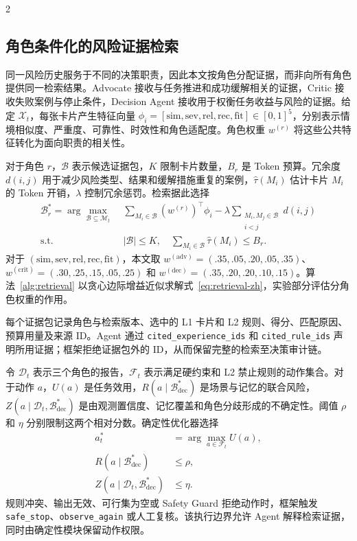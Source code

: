 \documentclass[10pt]{article}
\newcommand{\code}[1]{\texttt{#1}}
\begin{document}
\begin{multicols}{2}
\subsection{角色条件化的风险证据检索}

同一风险历史服务于不同的决策职责，因此本文按角色分配证据，而非向所有角色提供同一检索结果。Advocate 接收与任务推进和成功缓解相关的证据，Critic 接收失败案例与停止条件，Decision Agent 接收用于权衡任务收益与风险的证据。给定 $\mathcal{X}_t$，每张卡片产生特征向量 $\phi_i=[\mathrm{sim},\mathrm{sev},\mathrm{rel},\mathrm{rec},\mathrm{fit}]\in[0,1]^5$，分别表示情境相似度、严重度、可靠性、时效性和角色适配度。角色权重 $w^{(r)}$ 将这些公共特征转化为面向职责的相关性。

对于角色 $r$，$\mathcal{B}$ 表示候选证据包，$K$ 限制卡片数量，$B_r$ 是 Token 预算。冗余度 $d(i,j)$ 用于减少风险类型、结果和缓解措施重复的案例，$\widehat{\tau}(M_i)$ 估计卡片 $M_i$ 的 Token 开销，$\lambda$ 控制冗余惩罚。检索据此选择
\begin{equation}
\begin{aligned}
\mathcal{B}_r^*=\arg\max_{\mathcal{B}\subseteq\mathcal{M}_t}\;&
\sum_{M_i\in\mathcal{B}}(w^{(r)})^\top\phi_i
-\lambda\!\sum_{\substack{M_i,M_j\in\mathcal{B}\\i<j}}d(i,j)\\
\text{s.t. }\;&|\mathcal{B}|\leq K,\quad
\sum_{M_i\in\mathcal{B}}\widehat{\tau}(M_i)\leq B_r .
\end{aligned}
\label{eq:retrieval-zh}
\end{equation}
对于 $(\mathrm{sim},\mathrm{sev},\mathrm{rel},\mathrm{rec},\mathrm{fit})$，本文取 $w^{(\mathrm{adv})}=(.35,.05,.20,.05,.35)$、$w^{(\mathrm{crit})}=(.30,.25,.15,.05,.25)$ 和 $w^{(\mathrm{dec})}=(.35,.20,.20,.10,.15)$。算法~\ref{alg:retrieval} 以贪心边际增益近似求解式~\eqref{eq:retrieval-zh}，实验部分评估分角色权重的作用。

每个证据包记录角色与检索版本、选中的 L1 卡片和 L2 规则、得分、匹配原因、预算用量及来源 ID。Agent 通过 \code{cited\_experience\_ids} 和 \code{cited\_rule\_ids} 声明所用证据；框架拒绝证据包外的 ID，从而保留完整的检索至决策审计链。

令 $\mathcal{D}_t$ 表示三个角色的报告，$\mathcal{F}_t$ 表示满足硬约束和 L2 禁止规则的动作集合。对于动作 $a$，$U(a)$ 是任务效用，$R(a\mid\mathcal{B}_{\mathrm{dec}}^*)$ 是场景与记忆的联合风险，$Z(a\mid\mathcal{D}_t,\mathcal{B}_{\mathrm{dec}}^*)$ 是由观测置信度、记忆覆盖和角色分歧形成的不确定性。阈值 $\rho$ 和 $\eta$ 分别限制这两个相对分数。确定性优化器选择
\begin{equation}
\begin{aligned}
a_t^*&=\arg\max_{a\in\mathcal{F}_t}U(a),\\
R(a\mid\mathcal{B}_{\mathrm{dec}}^*)&\leq\rho,\\
Z(a\mid\mathcal{D}_t,\mathcal{B}_{\mathrm{dec}}^*)&\leq\eta.
\end{aligned}
\label{eq:decision-zh}
\end{equation}
规则冲突、输出无效、可行集为空或 Safety Guard 拒绝动作时，框架触发 \code{safe\_stop}、\code{observe\_again} 或人工复核。该执行边界允许 Agent 解释检索证据，同时由确定性模块保留动作权限。


\end{multicols}
\end{document}

